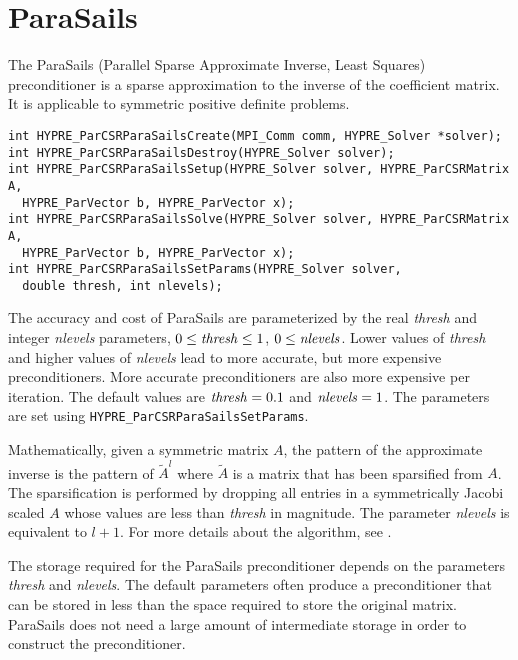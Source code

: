 \section{ParaSails}

The ParaSails (Parallel Sparse Approximate Inverse, Least Squares) 
preconditioner is a sparse approximation to the inverse of the 
coefficient matrix.  It is applicable to symmetric positive definite
problems.  

\begin{display}
\begin{verbatim}
int HYPRE_ParCSRParaSailsCreate(MPI_Comm comm, HYPRE_Solver *solver);
int HYPRE_ParCSRParaSailsDestroy(HYPRE_Solver solver);
int HYPRE_ParCSRParaSailsSetup(HYPRE_Solver solver, HYPRE_ParCSRMatrix A,
  HYPRE_ParVector b, HYPRE_ParVector x);
int HYPRE_ParCSRParaSailsSolve(HYPRE_Solver solver, HYPRE_ParCSRMatrix A,
  HYPRE_ParVector b, HYPRE_ParVector x);
int HYPRE_ParCSRParaSailsSetParams(HYPRE_Solver solver, 
  double thresh, int nlevels);
\end{verbatim}
\end{display}

The accuracy and cost of ParaSails are parameterized by the real {\em thresh}
and integer {\em nlevels} parameters, 
$0 \le {\it thresh} \le 1$, $0 \le {\it nlevels}$.  
Lower values of {\em thresh}
and higher values of {\em nlevels} lead to more accurate, but more expensive
preconditioners.  More accurate preconditioners are also more expensive
per iteration.  The default values are ${\it thresh} = 0.1$
and ${\it nlevels} = 1$.  The parameters are set using 
{\tt HYPRE\_ParCSRParaSailsSetParams}.

Mathematically, given a symmetric matrix $A$, the pattern of the 
approximate inverse is the pattern of $\tilde{A}^l$ where $\tilde{A}$
is a matrix that has been sparsified from $A$.  The sparsification 
is performed by dropping all entries in a symmetrically Jacobi scaled $A$
whose values are less than {\em thresh} in magnitude.  The parameter
{\em nlevels} is equivalent to $l+1$.
For more details about the algorithm, see \cite{Chow:1999:APS}.

The storage required for the ParaSails preconditioner depends on 
the parameters {\em thresh} and {\em nlevels}.  The default parameters
often produce a preconditioner that can be stored in less than the 
space required to store the original matrix.
ParaSails does not need a large amount of intermediate storage in 
order to construct the preconditioner.

